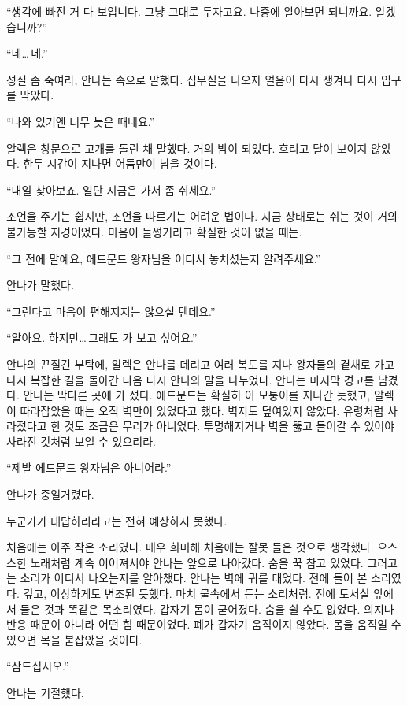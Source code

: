 ``생각에 빠진 거 다 보입니다. 그냥 그대로 두자고요. 나중에 알아보면 되니까요. 알겠습니까?''

``네\ldots\,네.''

성질 좀 죽여라, 안나는 속으로 말했다. 집무실을 나오자 얼음이 다시 생겨나 다시 입구를 막았다.

``나와 있기엔 너무 늦은 때네요.''

알렉은 창문으로 고개를 돌린 채 말했다. 거의 밤이 되었다. 흐리고 달이 보이지 않았다. 한두 시간이 지나면 어둠만이 남을 것이다.

``내일 찾아보죠. 일단 지금은 가서 좀 쉬세요.''

조언을 주기는 쉽지만, 조언을 따르기는 어려운 법이다. 지금 상태로는 쉬는 것이 거의 불가능할 지경이었다. 마음이 들썽거리고 확실한 것이 없을 때는.

``그 전에 말예요, 에드문드 왕자님을 어디서 놓치셨는지 알려주세요.''

안나가 말했다.

``그런다고 마음이 편해지지는 않으실 텐데요.''

``알아요. 하지만\ldots\,그래도 가 보고 싶어요.''

안나의 끈질긴 부탁에, 알렉은 안나를 데리고 여러 복도를 지나 왕자들의 곁채로 가고 다시 복잡한 길을 돌아간 다음 다시 안나와 말을 나누었다. 안나는 마지막 경고를 남겼다. 안나는 막다른 곳에 가 섰다. 에드문드는 확실히 이 모퉁이를 지나간 듯했고, 알렉이 따라잡았을 때는 오직 벽만이 있었다고 했다. 벽지도 덮여있지 않았다. 유령처럼 사라졌다고 한 것도 조금은 무리가 아니었다. 투명해지거나 벽을 뚫고 들어갈 수 있어야 사라진 것처럼 보일 수 있으리라.

``제발 에드문드 왕자님은 아니어라.''

안나가 중얼거렸다.

누군가가 대답하리라고는 전혀 예상하지 못했다.

처음에는 아주 작은 소리였다. 매우 희미해 처음에는 잘못 들은 것으로 생각했다. 으스스한 노래처럼 계속 이어져서야 안나는 앞으로 나아갔다. 숨을 꾹 참고 있었다. 그러고는 소리가 어디서 나오는지를 알아챘다. 안나는 벽에 귀를 대었다. 전에 들어 본 소리였다. 깊고, 이상하게도 변조된 듯했다. 마치 물속에서 듣는 소리처럼. 전에 도서실 앞에서 들은 것과 똑같은 목소리였다. 갑자기 몸이 굳어졌다. 숨을 쉴 수도 없었다. 의지나 반응 때문이 아니라 어떤 힘 때문이었다. 폐가 갑자기 움직이지 않았다. 몸을 움직일 수 있으면 목을 붙잡았을 것이다.

``잠드십시오.''

안나는 기절했다.

